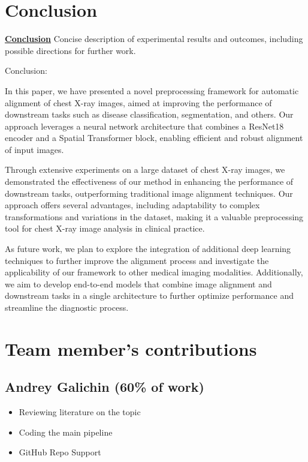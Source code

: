 \documentclass{article}
\begin{document}
\section{Conclusion}\label{conclusion}

\underline{\textbf{Conclusion}} Concise description of experimental results and outcomes, including possible directions for further work.

Conclusion:

In this paper, we have presented a novel preprocessing framework for automatic alignment of chest X-ray images, aimed at improving the performance of downstream tasks such as disease classification, segmentation, and others. Our approach leverages a neural network architecture that combines a ResNet18 encoder and a Spatial Transformer block, enabling efficient and robust alignment of input images.

Through extensive experiments on a large dataset of chest X-ray images, we demonstrated the effectiveness of our method in enhancing the performance of downstream tasks, outperforming traditional image alignment techniques. Our approach offers several advantages, including adaptability to complex transformations and variations in the dataset, making it a valuable preprocessing tool for chest X-ray image analysis in clinical practice.

As future work, we plan to explore the integration of additional deep learning techniques to further improve the alignment process and investigate the applicability of our framework to other medical imaging modalities. Additionally, we aim to develop end-to-end models that combine image alignment and downstream tasks in a single architecture to further optimize performance and streamline the diagnostic process.



\clearpage

\newpage
\appendix
\section{Team member's contributions}
\label{appendix-contrib}

\subsection*{Andrey Galichin (60\% of work)}
\begin{itemize}
    \item Reviewing literature on the topic
    \item Coding the main pipeline
    \item GitHub Repo Support
\end{itemize}
\end{document}

